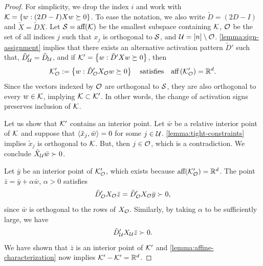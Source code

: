 \coneContainment*
\begin{proof}
    For simplicity, we drop the index \( i \) and work with \( \mathcal{K} = \left\{w : (2 D - I) X w \succeq 0 \right\} \).
    To ease the notation, we also write \( \tilde D = (2 D - I) \) and \( \tilde X = \tilde D X \).
    Let \( \mathcal{S} = \text{aff} (\mathcal{K}) \) be the smallest subspace containing \( \mathcal{K} \),
    \( \mathcal{O} \) be the set of all indices \( j \) such that \( x_j \) is orthogonal to \( \mathcal{S} \),
    and \( \mathcal{U} = [n] \setminus \mathcal{O} \).
    \cref{lemma:sign-assignment} implies that there exists an alternative activation pattern \( \tilde D' \) such that,
    \( \tilde D_{\mathcal{U}}' = \tilde D_{\mathcal{U}} \), and
    if \( \mathcal{K}' = \left\{w : \tilde D' X w \succeq 0 \right\} \), then
    \[
        \mathcal{K}'_{\mathcal{O}} := \left\{w : \tilde D_{\mathcal{O}}' X_{\mathcal{O}} w \succeq 0\right\} \quad \text{satisfies} \quad \text{aff} \left(\mathcal{K}_{\mathcal{O}}'\right) = \mathbb{R}^d.
    \]
    Since the vectors indexed by \( \mathcal{O} \) are orthogonal to \( \mathcal{S} \), they are also orthogonal to every \( w \in \mathcal{K} \), implying \( \mathcal{K} \subset \mathcal{K}' \).
    In other words, the change of activation signs preserves inclusion of \( \mathcal{K} \).

    Let us show that \( \mathcal{K}' \) contains an interior point.
    Let \( \bar w \) be a relative interior point of \( \mathcal{K} \) and suppose that \( \left\langle\tilde x_j, \bar w\right\rangle = 0 \) for some \( j \in \mathcal{U} \).
    \cref{lemma:tight-constraints} implies \( \tilde x_j \) is orthogonal to \( \mathcal{K} \).
    But, then \( j \in \mathcal{O} \), which is a contradiction.
    We conclude \( \tilde X_{\mathcal{U} }\bar w \succ 0\).

    Let \( \bar y \) be an interior point of \( \mathcal{K}'_{\mathcal{O}} \), which exists because \( \text{aff} (\mathcal{K}'_{\mathcal{O}}) = \mathbb{R}^d \).
    The point \( \bar z = \bar y + \alpha \bar w \), \( \alpha > 0 \) satisfies
    \[
        \tilde D_{\mathcal{O}}' X_{\mathcal{O}} \bar z = \tilde D_{\mathcal{O}}' X_{\mathcal{O}} \bar y \succ 0,
    \]
    since \( \bar w \) is orthogonal to the rows of \( X_{\mathcal{O}} \).
    Similarly, by taking \( \alpha \) to be sufficiently large, we have
    \[
        \tilde D_{\mathcal{U}}' X_{\mathcal{U}} \bar z \succ 0.
    \]
    We have shown that \( \bar z \) is an interior point of \( \mathcal{K}' \)
    and \cref{lemma:affine-characterization} now implies \( \mathcal{K}' - \mathcal{K}' = \mathbb{R}^d \).
\end{proof}

